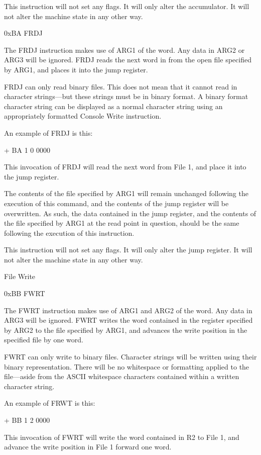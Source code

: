 \documentclass[]{article}
\begin{document}
This instruction will not set any flags. It will only alter the
accumulator. It will not alter the machine state in any other way.

0xBA FRDJ

The FRDJ instruction makes use of ARG1 of the word. Any data in ARG2 or
ARG3 will be ignored. FRDJ reads the next word in from the open file
specified by ARG1, and places it into the jump register.

FRDJ can only read binary files. This does not mean that it cannot read
in character strings---but these strings must be in binary format. A
binary format character string can be displayed as a normal character
string using an appropriately formatted Console Write instruction.

An example of FRDJ is this:

+ BA 1 0 0000

This invocation of FRDJ will read the next word from File 1, and place
it into the jump register.

The contents of the file specified by ARG1 will remain unchanged
following the execution of this command, and the contents of the jump
register will be overwritten. As such, the data contained in the jump
register, and the contents of the file specified by ARG1 at the read
point in question, should be the same following the execution of this
instruction.

This instruction will not set any flags. It will only alter the jump
register. It will not alter the machine state in any other way.

File Write

0xBB FWRT

The FWRT instruction makes use of ARG1 and ARG2 of the word. Any data in
ARG3 will be ignored. FWRT writes the word contained in the register
specified by ARG2 to the file specified by ARG1, and advances the write
position in the specified file by one word.

FWRT can only write to binary files. Character strings will be written
using their binary representation. There will be no whitespace or
formatting applied to the file---aside from the ASCII whitespace
characters contained within a written character string.

An example of FRWT is this:

+ BB 1 2 0000

This invocation of FWRT will write the word contained in R2 to File 1,
and advance the write position in File 1 forward one word.
\end{document}

